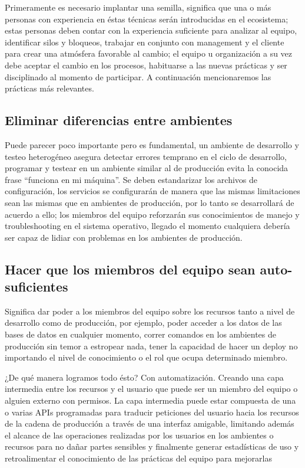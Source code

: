 \documentclass[conference]{IEEEtran}
\begin{document}
Primeramente es necesario implantar una semilla, significa que una o más personas con experiencia en éstas técnicas serán introducidas en el ecosistema; estas personas deben contar con la experiencia suficiente para analizar al equipo, identificar silos y bloqueos, trabajar en conjunto con management y el cliente para crear una atmósfera favorable al cambio; el equipo u organización a su vez debe aceptar el cambio en los procesos, habituarse a las nuevas prácticas y ser disciplinado al momento de participar. A continuación mencionaremos las prácticas más relevantes.

\subsection{Eliminar diferencias entre ambientes}

Puede parecer poco importante pero es fundamental, un ambiente de desarrollo y testeo heterogéneo asegura detectar errores temprano en el ciclo de desarrollo, programar y testear en un ambiente similar al de producción evita la conocida frase “funciona en mi máquina”. Se deben estandarizar los archivos de configuración, los servicios se configurarán de manera que las mismas limitaciones sean las mismas que en ambientes de producción, por lo tanto se desarrollará de acuerdo a ello; los miembros del equipo reforzarán sus conocimientos de manejo y troubleshooting en el sistema operativo, llegado el momento cualquiera debería ser capaz de lidiar con problemas en los ambientes de producción.

\subsection{Hacer que los miembros del equipo sean auto-suficientes}

Significa dar poder a los miembros del equipo sobre los recursos tanto a nivel de desarrollo como de producción, por ejemplo, poder acceder a los datos de las bases de datos en cualquier momento, correr comandos en los ambientes de producción sin temor a estropear nada, tener la capacidad de hacer un deploy no importando el nivel de conocimiento o el rol que ocupa determinado miembro.

¿De qué manera logramos todo ésto? Con automatización. Creando una capa intermedia entre los recursos y el usuario que puede ser un miembro del equipo o alguien externo con permisos. La capa intermedia puede estar compuesta de una o varias APIs programadas para traducir peticiones del usuario hacia los recursos de la cadena de producción a través de una interfaz amigable, limitando además el alcance de las operaciones realizadas por los usuarios en los ambientes o recursos para no dañar partes sensibles y finalmente generar estadísticas de uso y retroalimentar el conocimiento de las prácticas del equipo para mejorarlas
\end{document}
